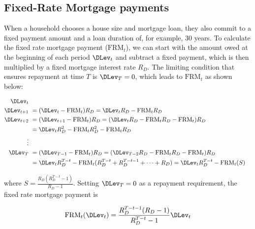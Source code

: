 \documentclass[PortfolioChoiceWithRiskyHousing]{subfiles}
\begin{document}
\subsection{Fixed-Rate Mortgage payments}

When a household chooses a house size and mortgage loan, they also commit to a fixed payment amount and a loan duration of, for example, 30 years. To calculate the fixed rate mortgage payment ($\text{FRM}_{t}$), we can start with the amount owed at the beginning of each period $\DLev_{t}$ and subtract a fixed payment, which is then multiplied by a fixed mortgage interest rate $R_D$. The limiting condition that ensures repayment at time $T$ is $\DLev_{T}=0$, which leads to $\text{FRM}_{t}$ as shown below:

\begin{equation}
	\begin{split}
		\DLev_{t}                                                                                                                      \\
		\DLev_{t+1} &~ = (\DLev_{t} - \text{FRM}_{t})R_D = \DLev_{t} R_D - \text{FRM}_{t} R_D                                                   \\
		\DLev_{t+2} &~ = (\DLev_{t+1} - \text{FRM}_{t}) R_D = (\DLev_{t} R_D - \text{FRM}_{t} R_D - \text{FRM}_{t}) R_D                         \\
		&~ = \DLev_{t} R_D^2 - \text{FRM}_{t} R_D^2 - \text{FRM}_{t} R_D                                                        \\
		\vdots                                                                                                                     \\
		\DLev_{T}     &~ = (\DLev_{T-1}-\text{FRM}_{t}) R_D = (\DLev_{T-2}R_D - \text{FRM}_{t} R_D - \text{FRM}_{t})R_D                           \\
		&~ = \DLev_{t} R_D^{T-t} - \text{FRM}_{t}(R_D^{T-t} + R_D^{T-t-1} + \cdots + R_D) = \DLev_{t} R_D^{T-t} - \text{FRM}_{t}(S)
	\end{split}
\end{equation}

where $S=\frac{R_D(R_D^{T-t}-1)}{R_D-1}$. Setting $\DLev_{T}=0$ as a repayment requirement, the fixed rate mortgage payment is

\begin{equation}
	\text{FRM}_{t}(\DLev_{t}) = \frac{R_D^{T-t-1}(R_D-1)}{R_D^{T-t} -1} \DLev_{t}
\end{equation}
\end{document}
